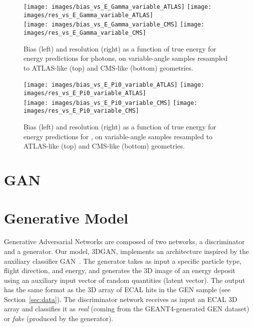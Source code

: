 \begin{figure*}[htbp]
\centering
\texttt{[image: images/bias\_vs\_E\_Gamma\_variable\_ATLAS]}
\texttt{[image: images/res\_vs\_E\_Gamma\_variable\_ATLAS]} \\
\texttt{[image: images/bias\_vs\_E\_Gamma\_variable\_CMS]}
\texttt{[image: images/res\_vs\_E\_Gamma\_variable\_CMS]}
\caption{Bias (left) and resolution (right) as a function of true energy for energy predictions for photons, on variable-angle samples resampled to ATLAS-like (top) and CMS-like (bottom) geometries.\label{fig:reg_resampled_gamma_ATLAS_CMS}}
\end{figure*}

\begin{figure*}[htbp]
\centering
\texttt{[image: images/bias\_vs\_E\_Pi0\_variable\_ATLAS]}
\texttt{[image: images/res\_vs\_E\_Pi0\_variable\_ATLAS]} \\
\texttt{[image: images/bias\_vs\_E\_Pi0\_variable\_CMS]}
\texttt{[image: images/res\_vs\_E\_Pi0\_variable\_CMS]}
\caption{Bias (left) and resolution (right) as a function of true energy for energy predictions for \pizero, on variable-angle samples resampled to  ATLAS-like (top) and CMS-like (bottom) geometries.\label{fig:reg_resampled_pi0_ATLAS_CMS}}
\end{figure*}

\section{GAN}

\section{Generative Model}\label{sec:GAN}

Generative Adversarial Networks are composed of two networks, a discriminator and a generator. Our model, 3DGAN, implements an architecture inspired by the auxiliary classifier GAN~\cite{acgan}. The generator takes as input a specific particle type, flight direction, and energy, and generates the 3D image of an energy deposit using an auxiliary input vector of random quantities (latent vector). 
The output has the same format as the 3D array of ECAL hits in the GEN sample (see Section~\ref{sec:data}). The discriminator network receives as input an ECAL 3D array and classifies it as {\it real} (coming from the GEANT4-generated GEN dataset) or {\it fake} (produced by the generator).

